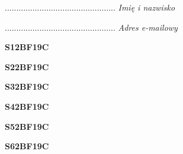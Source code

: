 \begin{turn}{90}\begin{minipage}{\linewidth} \vspace{20mm} ................................................  \textit{Imię i nazwisko}\end{minipage}\end{turn}

\begin{turn}{90}\begin{minipage}{\linewidth} \vspace{20mm} ................................................  \textit{Adres e-mailowy}\end{minipage}\end{turn}

\begin{turn}{90}\huge \begin{minipage}{\linewidth} \vspace{10mm}\textbf{S12BF19C}\end{minipage}\end{turn}

\begin{turn}{90}\huge \begin{minipage}{\linewidth} \vspace{10mm}\textbf{S22BF19C}\end{minipage}\end{turn}

\begin{turn}{90}\huge \begin{minipage}{\linewidth} \vspace{10mm}\textbf{S32BF19C}\end{minipage}\end{turn}

\begin{turn}{90}\huge \begin{minipage}{\linewidth} \vspace{10mm}\textbf{S42BF19C}\end{minipage}\end{turn}

\begin{turn}{90}\huge \begin{minipage}{\linewidth} \vspace{10mm}\textbf{S52BF19C}\end{minipage}\end{turn}

\begin{turn}{90}\huge \begin{minipage}{\linewidth} \vspace{10mm}\textbf{S62BF19C}\end{minipage}\end{turn}

